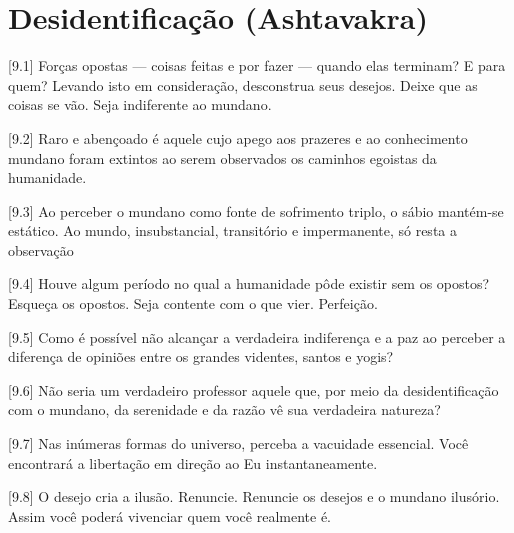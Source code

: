 \chapter[(Ashtavakra)]{Desidentificação (Ashtavakra)}

[9.1] Forças opostas --- coisas feitas e por fazer --- quando elas terminam? E para quem? Levando isto em consideração, desconstrua seus desejos. Deixe que as coisas se vão. Seja indiferente ao mundano.

[9.2] Raro e abençoado é aquele cujo apego aos prazeres e ao conhecimento mundano foram extintos ao serem observados os caminhos egoistas da humanidade.

[9.3] Ao perceber o mundano como fonte de sofrimento triplo, o sábio man\-tém-se estático. Ao mundo, insubstancial, transitório e impermanente, só resta a observação

[9.4] Houve algum período no qual a humanidade pôde existir sem os opostos? Esqueça os opostos. Seja contente com o que vier. Perfeição.

[9.5] Como é possível não alcançar a verdadeira indiferença e a paz ao perceber a diferença de opiniões entre os grandes videntes, santos e yogis?

[9.6] Não seria um verdadeiro professor aquele que, por meio da desidentificação com o mundano, da serenidade e da razão vê sua verdadeira natureza?

[9.7] Nas inúmeras formas do universo, perceba a vacuidade essencial. Você encontrará a libertação em direção ao Eu instantaneamente.

[9.8] O desejo cria a ilusão. Renuncie. Renuncie os desejos e o mundano ilusório. Assim você poderá vivenciar quem você realmente é.
